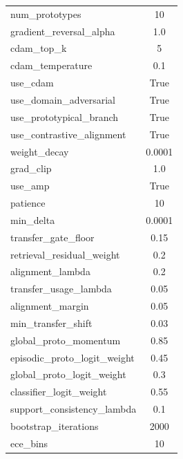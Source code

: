 \begin{table}[t]
{\begin{tabular}{@{}lc@{}}
num\_prototypes & 10 \\
gradient\_reversal\_alpha & 1.0 \\
cdam\_top\_k & 5 \\
cdam\_temperature & 0.1 \\
use\_cdam & True \\
use\_domain\_adversarial & True \\
use\_prototypical\_branch & True \\
use\_contrastive\_alignment & True \\
weight\_decay & 0.0001 \\
grad\_clip & 1.0 \\
use\_amp & True \\
patience & 10 \\
min\_delta & 0.0001 \\
transfer\_gate\_floor & 0.15 \\
retrieval\_residual\_weight & 0.2 \\
alignment\_lambda & 0.2 \\
transfer\_usage\_lambda & 0.05 \\
alignment\_margin & 0.05 \\
min\_transfer\_shift & 0.03 \\
global\_proto\_momentum & 0.85 \\
episodic\_proto\_logit\_weight & 0.45 \\
global\_proto\_logit\_weight & 0.3 \\
classifier\_logit\_weight & 0.55 \\
support\_consistency\_lambda & 0.1 \\
bootstrap\_iterations & 2000 \\
ece\_bins & 10 \\
\bottomrule
\end{tabular}%
}
\end{table}
